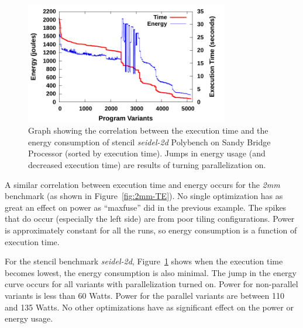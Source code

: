 \begin{figure}[bt]
    \includegraphics[width=3.5in]{Seidel2D}
    \caption{Graph showing the correlation between the execution time and the
energy consumption of stencil \emph{seidel-2d} Polybench on Sandy Bridge Processor (sorted by execution time).
Jumps in energy usage (and decreased execution time) are results of turning parallelization on.
}
    \label{fig:seidel2d-TE}
\end{figure}
A similar correlation between execution time and energy occurs for the \emph{2mm} benchmark 
(as shown in Figure~\ref{fig:2mm-TE}). No single optimization has as great an effect on power
as ``maxfuse'' did in the previous example. The spikes that do occur (especially the left side)
are from poor tiling configurations. Power is approximately constant for all the runs, so energy
consumption is a function of execution time.

For the stencil benchmark \emph{seidel-2d}, Figure~\ref{fig:seidel2d-TE} shows
when the execution time becomes lowest, the energy consumption is also minimal.
The jump in the energy curve occurs for all variants with parallelization turned on.
Power for non-parallel variants is less than 60 Watts. Power for the parallel variants
are between 110 and 135 Watts. No other optimizations have as significant effect on the power
or energy usage.
